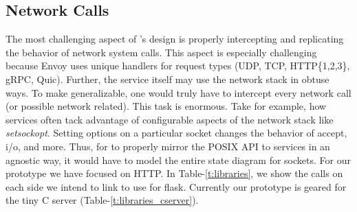 \begin{table}[!ht]
    \begin{center}
        \caption{Libc Functions Preloaded (Tiny C Webserver)}
        \label{t:libraries_cserver}
    \end{center}
\end{table}

\subsection{\sysname Network Calls}
The most challenging aspect of \sysname's design is properly intercepting and replicating the behavior of network system calls.
This aspect is especially challenging because Envoy uses unique handlers for request types (UDP, TCP, HTTP\{1,2,3\}, gRPC, Quic).
Further, the service itself may use the network stack in obtuse ways.
To make \sysname generalizable, one would truly have to intercept every network call (or possible network related).
This task is enormous.
Take for example, how services often tack advantage of configurable aspects of the network stack like \textit{setsockopt}.
Setting options on a particular socket changes the behavior of accept, i/o, and more.
Thus, for \sysname to properly mirror the POSIX API to services in an agnostic way, it would have to model the entire state diagram for sockets.
For our prototype we have focused on HTTP.
In Table-\ref{t:libraries}, we show the calls on each side we intend to link to use \sysname for flask.
Currently our prototype is geared for the tiny C server (Table-\ref{t:libraries_cserver}).


